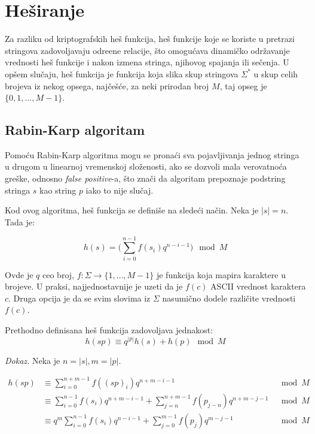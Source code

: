 \section{He\v siranje}

Za razliku od kriptografskih he\v s funkcija, he\v s funkcije koje se koriste u pretrazi stringova zadovoljavaju odre\dj ene relacije, \v sto omogu\' cava dinami\v cko odr\v zavanje vrednosti he\v s funkcije i nakon izmena stringa, njihovog spajanja ili se\v cenja. U op\v sem slu\v caju, he\v s funkcija je funkcija koja slika skup stringova $\Sigma^*$ u skup celih brojeva iz nekog opsega, naj\v ce\v s\' ce, za neki prirodan broj $M$, taj opseg je $\{0, 1, \ldots, M-1\}$.

\subsection{Rabin-Karp algoritam}

Pomo\' cu Rabin-Karp algoritma mogu se prona\' ci sva pojavljivanja jednog stringa u drugom u linearnoj vremenskoj slo\v zenosti, ako se dozvoli mala verovatno\' ca gre\v ske, odnosno \textit{false positive}-a, \v sto zna\v ci da algoritam prepoznaje podstring stringa $s$ kao string $p$ iako to nije slu\v caj.

Kod ovog algoritma, he\v s funkcija se defini\v se na slede\' ci na\v cin. Neka je $|s| = n$. Tada je:

\begin{equation}
    h(s) = \Big(\sum_{i=0}^{n-1} f(s_i)q^{n-i-1}\Big) \mod M
\end{equation}

Ovde je $q$ ceo broj, $f : \Sigma \rightarrow \{1, \ldots, M-1\}$ je funkcija koja mapira karaktere u brojeve. U praksi, najjednostavnije je uzeti da je $f(c)$ ASCII vrednost karaktera $c$. Druga opcija je da se svim slovima iz $\Sigma$ nasumi\v cno dodele razli\v cite vrednosti $f(c)$.

\begin{thm}
Prethodno definisana he\v s funkcija zadovoljava jednakost:
\begin{equation}
\label{hashjednacina}
    h(sp) \equiv q^{|p|}h(s)+h(p) \mod M
\end{equation}
\end{thm}

\textit{Dokaz.} Neka je $n = |s|, m = |p|$.

\begin{align*}
     h(sp) & \equiv \sum_{i=0}^{n+m-1} f((sp)_i)q^{n+m-i-1} & \mod M \\
           & \equiv \sum_{i=0}^{n-1} f(s_i)q^{n+m-i-1} + \sum_{j=n}^{n+m-1} f(p_{j-n})q^{n+m-j-1} & \mod M \\
           & \equiv q^m \sum_{i=0}^{n-1} f(s_i)q^{n-i-1} + \sum_{j=0}^{m-1} f(p_{j})q^{m-j-1} & \mod M \\
\end{align*}

